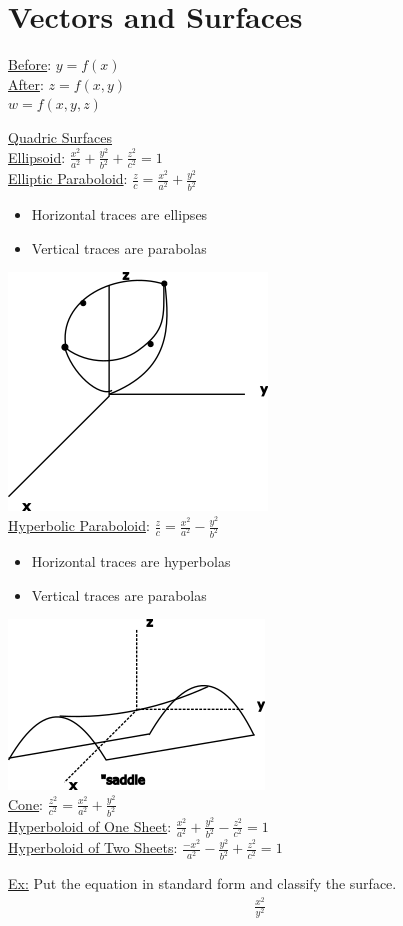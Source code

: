 \documentclass[12pt]{article}
\begin{document}
\section{Vectors and Surfaces}

\underline{Before}: \(y=f(x)\) \\%
\underline{After}: \(z=f(x,y)\) \\%
\(w = f(x,y,z)\) 


\underline{Quadric Surfaces}\\%
\underline{Ellipsoid}: $\frac{x^2}{a^2}+\frac{y^2}{b^2}+\frac{z^2}{c^2}=1$\\%
\underline{Elliptic Paraboloid}: $\frac{z}{c}=\frac{x^2}{a^2}+\frac{y^2}{b^2}$
\begin{itemize}
	\item Horizontal traces are ellipses
	\item Vertical traces are parabolas
\end{itemize}
\includegraphics{parabaloid}\\%
\underline{Hyperbolic Paraboloid}: $\frac{z}{c}=\frac{x^2}{a^2}-\frac{y^2}{b^2}$
\begin{itemize}
	\item Horizontal traces are hyperbolas
	\item Vertical traces are parabolas
\end{itemize}
\includegraphics{saddle}\\%
\underline{Cone}: $\frac{z^2}{c^2}=\frac{x^2}{a^2}+\frac{y^2}{b^2}$\\%
\underline{Hyperboloid of One Sheet}: $\frac{x^2}{a^2}+\frac{y^2}{b^2}-\frac{z^2}{c^2}=1$\\%
\underline{Hyperboloid of Two Sheets}: $\frac{-x^2}{a^2}-\frac{y^2}{b^2}+\frac{z^2}{c^2}=1$\

\underline{Ex:} Put the equation in standard form and classify the surface.
\begin{align}
	\frac{x^2}{y^2}
\end{align}
	
\end{document}
